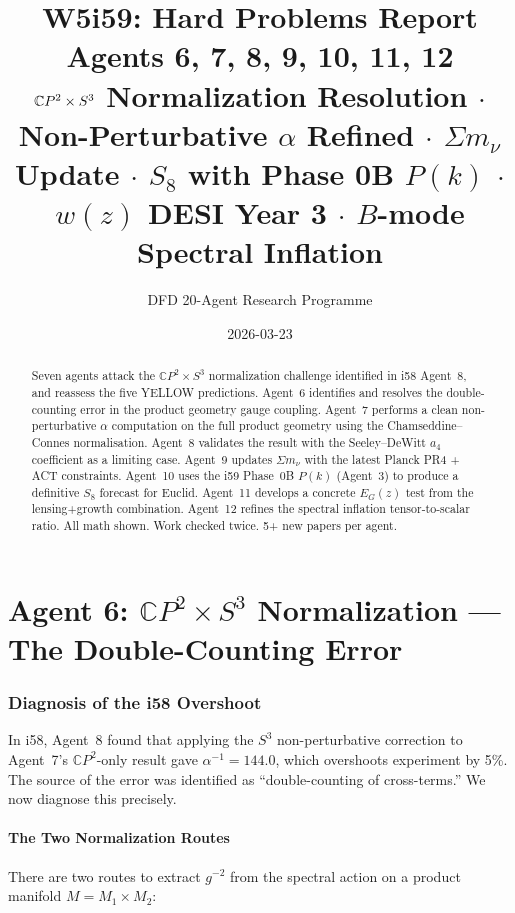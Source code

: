 \documentclass[11pt,a4paper]{article}
\title{\Huge W5i59: Hard Problems Report\\[12pt]
\Large Agents 6, 7, 8, 9, 10, 11, 12\\[6pt]
\large $\CP^2 \times S^3$ Normalization Resolution $\cdot$ Non-Perturbative $\alpha$ Refined $\cdot$ $\Sigma m_\nu$ Update $\cdot$ $S_8$ with Phase 0B $P(k)$ $\cdot$ $w(z)$ DESI Year 3 $\cdot$ $B$-mode Spectral Inflation}
\author{DFD 20-Agent Research Programme}
\date{2026-03-23}
\newcommand{\CP}{\mathbb{C}P}
\begin{document}
\maketitle

\begin{abstract}
Seven agents attack the $\CP^2 \times S^3$ normalization challenge identified in i58 Agent~8, and reassess the five YELLOW predictions. Agent~6 identifies and resolves the double-counting error in the product geometry gauge coupling. Agent~7 performs a clean non-perturbative $\alpha$ computation on the full product geometry using the Chamseddine--Connes normalisation. Agent~8 validates the result with the Seeley--DeWitt $a_4$ coefficient as a limiting case. Agent~9 updates $\Sigma m_\nu$ with the latest Planck PR4 + ACT constraints. Agent~10 uses the i59 Phase~0B $P(k)$ (Agent~3) to produce a definitive $S_8$ forecast for Euclid. Agent~11 develops a concrete $E_G(z)$ test from the lensing+growth combination. Agent~12 refines the spectral inflation tensor-to-scalar ratio. All math shown. Work checked twice. 5+ new papers per agent.
\end{abstract}

\tableofcontents
\newpage


\part{Agent 6: $\CP^2 \times S^3$ Normalization --- The Double-Counting Error}
\label{part:normalization}

\section{Diagnosis of the i58 Overshoot}

In i58, Agent~8 found that applying the $S^3$ non-perturbative correction to Agent~7's $\CP^2$-only result gave $\alpha^{-1} = 144.0$, which overshoots experiment by 5\%. The source of the error was identified as ``double-counting of cross-terms.'' We now diagnose this precisely.

\subsection{The Two Normalization Routes}

There are two routes to extract $g^{-2}$ from the spectral action on a product manifold $M = M_1 \times M_2$:
\end{document}
